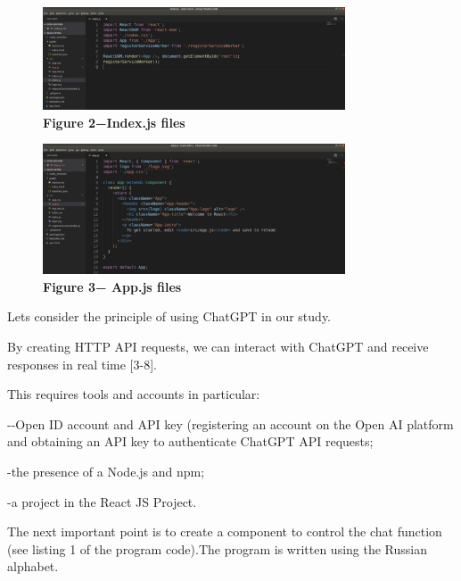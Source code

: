 \begin{figure}[H]
	\centering
	\includegraphics[width=0.8\textwidth]{assets/127}
	\caption*{\bfseries Figure 2−Index.js files}
\end{figure}


\begin{figure}[H]
	\centering
	\includegraphics[width=0.8\textwidth]{assets/128}
	\caption*{\bfseries Figure 3− App.js files}
\end{figure}

\begin{multicols}{2}


Let\textquotesingle s consider the principle of using ChatGPT in our
study.

By creating HTTP API requests, we can interact with ChatGPT and receive
responses in real time {[}3-8{]}.

This requires tools and accounts in particular:

-\/-Open ID account and API key (registering an account on the Open AI
platform and obtaining an API key to authenticate ChatGPT API requests;

-the presence of a Node.js and npm;

-a project in the React JS Project.


The next important point is to create a component to control the chat
function (see listing 1 of the program code).The program is written
using the Russian alphabet.
	

\end{multicols}


